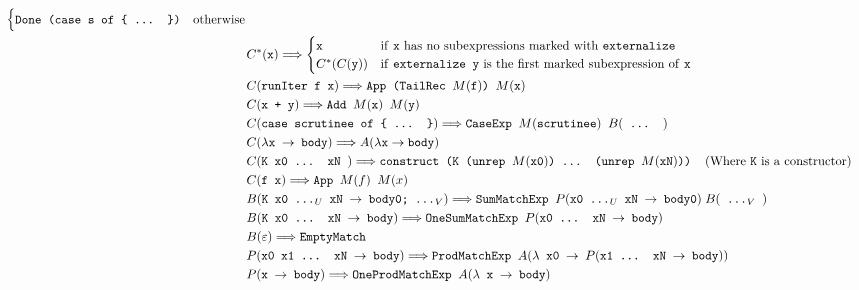 \documentclass[runningheads, a4paper]{llncs}
\newcommand{\expr}[1]{(#1)} %
\newcommand{\rarr}{\rightarrow}
\newcommand{\rewrites}{\Longrightarrow}
\newcommand{\ttt}{\texttt}
\begin{document}
\begin{figure}[hp]
\begin{align*}
\begin{cases}
        \ttt{Done (case s of \{ ... \})} & \text{otherwise}
      \end{cases}\\
  &C^{*}\expr{\ttt{x}} \rewrites
    \begin{cases}
      \ttt{x} & \text{if \ttt{x} has no subexpressions marked with \ttt{externalize}}\\
      C^{*}\expr{C\expr{\ttt{y}}} & \text{if \ttt{externalize y} is the first marked subexpression of \ttt{x}}\\
    \end{cases}\\
  &C\expr{\ttt{runIter f x}} \rewrites \ttt{App (TailRec $M\expr{\ttt{f}}$) $M\expr{\ttt{x}}$}\\
  &C\expr{\ttt{x + y}} \rewrites \ttt{Add $M\expr{\ttt{x}}$ $M\expr{\ttt{y}}$}\\
  &C\expr{\ttt{case scrutinee of \{ ... \}}} \rewrites \ttt{CaseExp $M\expr{\ttt{scrutinee}}$ } B\expr{\ttt{ ... }}\\
  &C\expr{\ttt{$\lambda$x $\rarr$ body}} \rewrites A\expr{\lambda \ttt{x} \rarr \ttt{body}}\\
  &C\expr{\ttt{K x0 ... xN }} \rewrites \ttt{construct (K (unrep $M\expr{\ttt{x0}}$) ... (unrep $M\expr{\ttt{xN}}$))}\;\;\;\;\text{(Where \ttt{K} is a constructor)}\\
  &C\expr{\ttt{f x}} \rewrites \ttt{App $M\expr{f}$ $M\expr{x}$}\\
  &B\expr{\ttt{K x0 ...$_U$ xN $\rarr$ body0; ...$_V$}} \rewrites \ttt{SumMatchExp }P\expr{\ttt{x0 ...$_U$ xN $\rarr$ body0}}\; B\expr{\ttt{ ...$_V$ }}\\
  &B\expr{\ttt{K x0 ... xN $\rarr$ body}} \rewrites \ttt{OneSumMatchExp }P\expr{\ttt{x0 ... xN $\rarr$ body}}\\
  &B\expr{\ttt{$\varepsilon$}} \rewrites \ttt{EmptyMatch}\\
  &P\expr{\ttt{x0 x1 ... xN $\rarr$ body}} \rewrites \ttt{ProdMatchExp }A\expr{\ttt{$\lambda$ x0 $\rarr$ $P\expr{\ttt{x1 ... xN $\rarr$ body}}$}}\\
  &P\expr{\ttt{x $\rarr$ body}} \rewrites \ttt{OneProdMatchExp }A\expr{\ttt{$\lambda$ x $\rarr$ body}}\\

\end{align*}
\end{figure}
\end{document}

